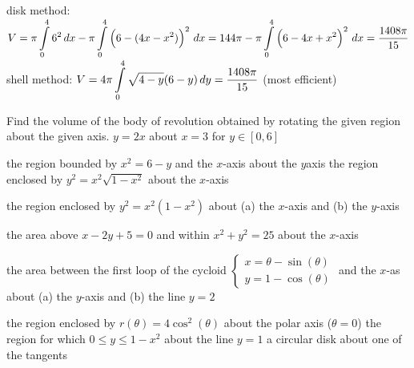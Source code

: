 \begin{Answer}
    \Question disk method: $V = \pi \displaystyle \int\limits_{0}^{4} 6^2 \, dx - \pi \displaystyle \int\limits_{0}^{4} \left(6-(4x-x^2)\right)^2 \, dx = 144 \pi- \pi \displaystyle \int\limits_{0}^{4} \left(6-4x+x^2\right)^2 \, dx = \dfrac{1408 \pi}{15}$ \\
    shell method: $V = 4\pi \displaystyle \int\limits_{0}^{4} \sqrt{4-y}(6-y) \, dy = \dfrac{1408 \pi}{15}$ \quad (most efficient)
    

\end{Answer}

\begin{Exercise}[label=oef_int_app_cissoide] Find the volume of the  body of revolution obtained by rotating the given region about the given axis. 
\Question[difficulty = 1] $ y = 2x $ about $ x = 3 $ for $ y \in [0,6] $ 

\ifcalculus
\Question[difficulty = 1] the region bounded by $x^2 = 6-y$ and the $x$-axis about the $y$axis
\Question[difficulty = 1] the region enclosed by  $y^2 = x^2\sqrt{1-x^2}$ about the $x$-axis
\fi

\ifanalysis\Question[difficulty = 1]\fi\ifcalculus\Question[difficulty = 2]\fi the region enclosed by $y^2 = x^2(1-x^2)$ about (a) the $x$-axis and (b) the $y$-axis

\ifcalculus
\Question[difficulty = 2] the area above $x - 2y + 5 = 0$ and within $x^2 + y^2 = 25$ about the $x$-axis  %
\fi 

\ifanalysis\Question[difficulty = 2]\fi\ifcalculus\Question[difficulty = 3]\fi the area between the first loop of the cycloid $\left\{ \begin{array}{l} x = \theta - \sin(\theta) \\ y = 1- \cos(\theta) \end{array}   \right.$ and the $x$-as about (a) the $y$-axis and (b) the line $y=2$ 

\ifcalculus
\Question[difficulty = 3] the region enclosed by $r(\theta) = 4 \cos^2(\theta)$ about the polar axis ($\theta = 0$)
\ifanalysis\Question[difficulty = 2]\fi\ifcalculus\Question[difficulty = 3]\fi the region for which $0 \leq y \leq 1-x^2$ about the line $y=1$ 
\Question[difficulty = 3] a circular disk about one of the tangents 
\fi    


\end{Exercise}

